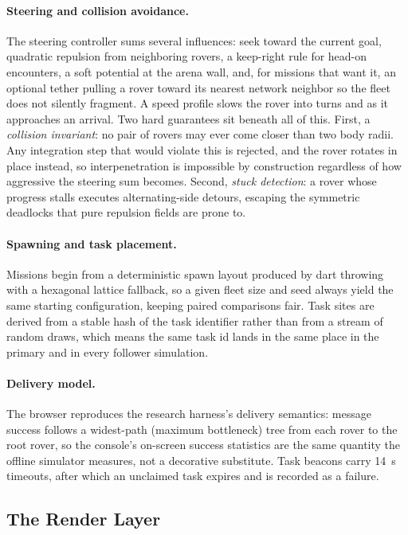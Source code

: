 \paragraph{Steering and collision avoidance.}
The steering controller sums several influences: seek toward the current
goal, quadratic repulsion from neighboring rovers, a keep-right rule for
head-on encounters, a soft potential at the arena wall, and, for missions
that want it, an optional tether pulling a rover toward its nearest
network neighbor so the fleet does not silently fragment. A speed profile
slows the rover into turns and as it approaches an arrival. Two hard
guarantees sit beneath all of this. First, a \emph{collision invariant}:
no pair of rovers may ever come closer than two body radii. Any
integration step that would violate this is rejected, and the rover
rotates in place instead, so interpenetration is impossible by
construction regardless of how aggressive the steering sum becomes.
Second, \emph{stuck detection}: a rover whose progress stalls executes
alternating-side detours, escaping the symmetric deadlocks that pure
repulsion fields are prone to.

\paragraph{Spawning and task placement.}
Missions begin from a deterministic spawn layout produced by dart throwing
with a hexagonal lattice fallback, so a given fleet size and seed always
yield the same starting configuration, keeping paired comparisons fair.
Task sites are derived from a stable hash of the task identifier rather
than from a stream of random draws, which means the same task id lands in
the same place in the primary and in every follower simulation.

\paragraph{Delivery model.}
The browser reproduces the research harness's delivery semantics: message
success follows a widest-path (maximum bottleneck) tree from each rover to
the root rover, so the console's on-screen success statistics are the same
quantity the offline simulator measures, not a decorative substitute. Task
beacons carry 14~s timeouts, after which an unclaimed task expires and is
recorded as a failure.

\subsection{The Render Layer}

